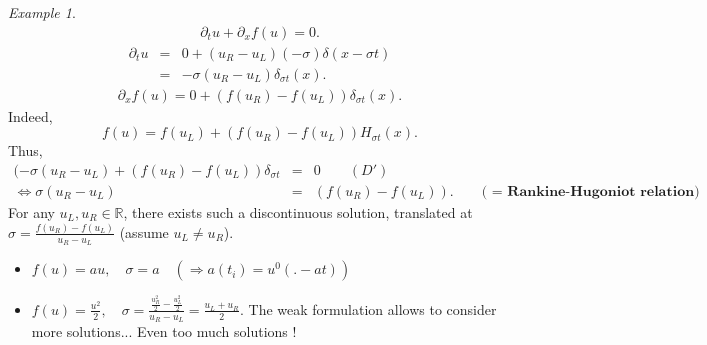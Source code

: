 \documentclass{report}
\newcommand{\R}{\ensuremath{\mathbb{R}}} %
\newcommand*{\definition}[1]{\noindent\textbf{\color{cadmiumgreen}{#1}}}
\theoremstyle{plain}
\theoremstyle{definition}
\theoremstyle{remark}
\newtheorem*{ex}{Example}
\begin{document}
\begin{ex}
\begin{eqnarray*}
        \partial_t u + \partial_x f(u) = 0.
        \end{eqnarray*}
        \begin{eqnarray*}
        \partial_t u &=& 0 + (u_R - u_L) (-\sigma)\delta(x-\sigma t) \\
        &=& -\sigma (u_R - u_L) \delta_{\sigma t}(x). \end{eqnarray*}
        \begin{eqnarray*}
        \partial_x f(u) = 0 + (f(u_R) - f(u_L)) \delta_{\sigma t}(x).
        \end{eqnarray*}
        Indeed, \begin{equation*}
            f(u) = f(u_L) + (f(u_R) - f(u_L)) H_{\sigma t}(x). 
        \end{equation*} 
        Thus, \begin{eqnarray*}
            (-\sigma(u_R-u_L)+(f(u_R)-f(u_L))\delta_{\sigma t} &=& 0 \qquad (D') \\
            \Leftrightarrow \sigma(u_R-u_L) &=& (f(u_R)-f(u_L)). \qquad \textbf{( = Rankine-Hugoniot relation)}
        \end{eqnarray*} 
        For any $u_L,u_R \in \R$, there exists such a discontinuous solution, translated at \definition{velocity} $\sigma = \frac{f(u_R)-f(u_L)}{u_R-u_L}$ (assume $u_L \not= u_R$).
        \begin{itemize}
            \item $f(u)=au, \quad \sigma = a \quad (\Rightarrow a(t_i) = u^0(.-at))$
            \item $f(u) = \frac{u^2}{2}, \quad \sigma = \frac{\frac{u_R^2}{2} - \frac{u_L^2}{2}}{u_R - u_L} = \frac{u_L + u_R}{2}$.
            The weak formulation allows to consider more solutions... Even too much solutions !
        \end{itemize}
    \end{ex}
\end{document}
